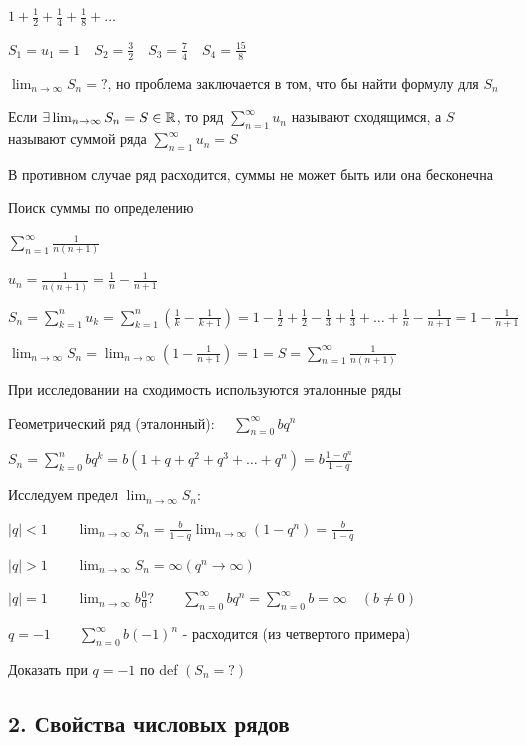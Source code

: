 \documentclass[12pt]{article}
\begin{document}
    \Ex $1 + \frac{1}{2} + \frac{1}{4} + \frac{1}{8} + \dots$

    $S_1 = u_1 = 1 \quad S_2 = \frac{3}{2} \quad S_3 = \frac{7}{4} \quad S_4 = \frac{15}{8}$

    $\lim_{n \to \infty} S_n = ?$, но проблема заключается в том, что бы найти формулу для $S_n$

    \Def Если $\exists \lim_{n \to\infty} S_n = S \in \mathbb{R}$, то ряд $\sum_{n = 1}^\infty u_n$ называют сходящимся,
    а $S$ называют суммой ряда $\sum_{n = 1}^\infty u_n = S$

    \Notas В противном случае ряд расходится, суммы не может быть или она бесконечна

    \Ex Поиск суммы по определению

    $\sum_{n = 1}^\infty \frac{1}{n (n + 1)}$

    $u_n = \frac{1}{n(n + 1)} = \frac{1}{n} - \frac{1}{n + 1}$

    $S_n = \sum_{k = 1}^n u_k = \sum_{k = 1}^n \left(\frac{1}{k} - \frac{1}{k + 1}\right) = 1 - \frac{1}{2} + \frac{1}{2} - \frac{1}{3} + \frac{1}{3} + \dots + \frac{1}{n} - \frac{1}{n + 1} = 1 - \frac{1}{n + 1}$

    $\lim_{n \to \infty} S_n = \lim_{n \to \infty} \left(1 - \frac{1}{n + 1}\right) = 1 = S = \sum_{n = 1}^\infty \frac{1}{n(n + 1)}$

    \Nota При исследовании на сходимость используются эталонные ряды

    \Ex Геометрический ряд (эталонный): \ \ $\sum_{n = 0}^\infty b q^n$

    $S_n = \sum_{k = 0}^n b q^k = b (1 + q + q^2 + q^3 + \dots + q^n) = b \frac{1 - q^n}{1 - q}$

    Исследуем предел $\lim_{n\to\infty} S_n$:

    $|q| < 1 \quad\quad \lim_{n\to\infty} S_n = \frac{b}{1 - q} \lim_{n \to\infty} (1 - q^n) = \frac{b}{1 - q}$

    $|q| > 1 \quad\quad \lim_{n\to\infty} S_n = \infty (q^n \to\infty)$

    $|q| = 1 \quad\quad \lim_{n\to\infty} b \frac{0}{0} ? \quad\quad \sum_{n = 0}^\infty b q^n = \sum_{n = 0}^\infty b = \infty \quad (b \neq 0)$

    $q = -1 \quad\quad \sum_{n = 0}^\infty b (-1)^n$ - расходится (из четвертого примера)

    \Lab Доказать при $q = -1$ по def $(S_n = ?)$\

    \subsection{2. Свойства числовых рядов}
\end{document}
